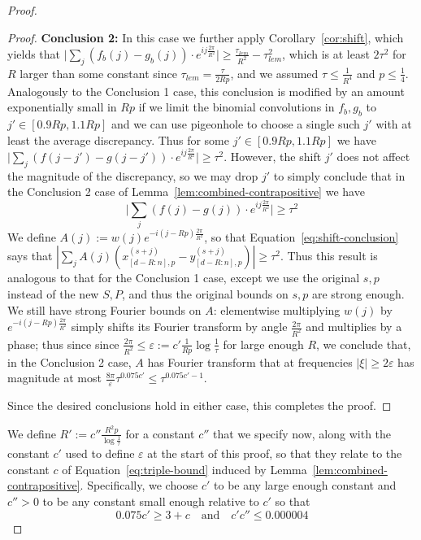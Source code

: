 \documentclass[10pt,a4paper]{amsart}
\newcommand{\eps}{\varepsilon}
\begin{document}
\begin{proof}
\begin{proof}
    \noindent \textbf{Conclusion 2:} In this case we further apply Corollary~\ref{cor:shift}, which yields that $\big|\sum_{j} (f_b(j)-g_b(j))\cdot e^{ij\frac{2\pi}{R^2}}\big|\geq \frac{\tau_{lem}}{R^2}-\tau_{lem}^2$, which is at least $2\tau^2$ for $R$ larger than some constant since $\tau_{lem}=\frac{\tau}{2Rp}$, and we assumed $\tau\leq \frac{1}{R^4}$ and $p\leq \frac{1}{4}$. 
    Analogously to the Conclusion 1 case, this conclusion is modified by an amount exponentially small in $Rp$ if we limit the binomial convolutions in $f_b,g_b$ to $j'\in[0.9Rp,1.1Rp]$ and we can use pigeonhole to choose a single such $j'$ with at least the average discrepancy. Thus for some $j'\in[0.9Rp,1.1Rp]$ we have $\big|\sum_{j} (f(j-j')-g(j-j'))\cdot e^{ij\frac{2\pi}{R^2}}\big|\geq \tau^2$. However, the shift $j'$ does not affect the magnitude of the discrepancy, so we may drop $j'$ to simply conclude that in the Conclusion 2 case of Lemma~\ref{lem:combined-contrapositive} we have \begin{equation}\label{eq:shift-conclusion}\big|\sum_{j} (f(j)-g(j))\cdot e^{ij\frac{2\pi}{R^2}}\big|\geq \tau^2\end{equation}
    We define $A(j):=w(j) e^{-i(j-Rp)\frac{2\pi}{R^2}}$, so that Equation~\ref{eq:shift-conclusion} says that $|\sum_j A(j)(x_{[d-R:n],p}^{(s+j)}-y_{[d-R:n],p}^{(s+j)})|\geq \tau^2$. Thus this result is analogous to that for the Conclusion 1 case, except we use the original $s,p$ instead of the new $S,P$, and thus the original bounds on $s,p$ are strong enough. We still have strong Fourier bounds on $A$: elementwise multiplying $w(j)$ by $e^{-i(j-Rp)\frac{2\pi}{R^2}}$ simply shifts its Fourier transform by angle $\frac{2\pi}{R^2}$ and multiplies by a phase; thus since since $\frac{2\pi}{R^2}\leq \eps:=c'\frac{1}{Rp}\log\frac{1}{\tau}$ for large enough $R$, we conclude that, in the Conclusion 2 case, $A$ has Fourier transform that at frequencies $|\xi|\geq 2\eps$ has magnitude at most $\frac{8\pi}{\eps} \tau^{0.075 c'} \leq \tau^{0.075 c' - 1}$. 

    Since the desired conclusions hold in either case, this completes the proof.
\end{proof}

We define $R':=c''\frac{R^2 p}{\log\frac{1}{\tau}}$ for a constant $c''$ that we specify now, along with the constant $c'$ used to define $\eps$ at the start of this proof, so that they relate to the constant $c$ of Equation~\ref{eq:triple-bound} induced by Lemma~\ref{lem:combined-contrapositive}. Specifically, we choose $c'$ to be any large enough constant and $c''>0$ to be any constant small enough relative to $c'$ so that
\begin{equation}\label{eq:constants}
0.075c'\geq 3+c\quad \textrm{and}\quad c'c''\leq 0.000004
\end{equation}


\end{proof}
\end{document}
